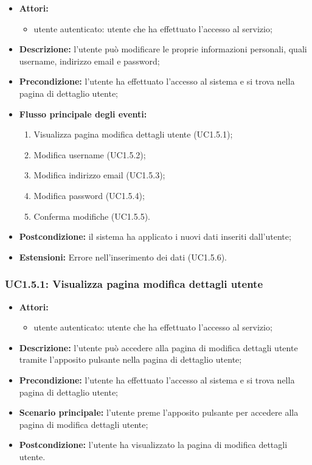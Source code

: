 \begin{itemize}
	\item \textbf{Attori:}
	\begin{itemize}
		\item utente autenticato: utente che ha effettuato l'accesso al servizio;
	\end{itemize}
	\item \textbf{Descrizione:} l'utente può modificare le proprie informazioni personali, quali username, indirizzo email e password;
	\item \textbf{Precondizione:} l'utente ha effettuato l'accesso al sistema e si trova nella pagina di dettaglio utente;
	\item \textbf{Flusso principale degli eventi:}
	\begin{enumerate}
		\item Visualizza pagina modifica dettagli utente (UC1.5.1);
		\item Modifica username (UC1.5.2);
		\item Modifica indirizzo email (UC1.5.3);
		\item Modifica password (UC1.5.4);
		\item Conferma modifiche (UC1.5.5).
	\end{enumerate}
	\item \textbf{Postcondizione:} il sistema ha applicato i nuovi dati inseriti dall'utente;
	\item \textbf{Estensioni:} Errore nell'inserimento dei dati (UC1.5.6).
\end{itemize}

\subsubsection{UC1.5.1: Visualizza pagina modifica dettagli utente}
\begin{itemize}
	\item \textbf{Attori:}
	\begin{itemize}
		\item utente autenticato: utente che ha effettuato l'accesso al servizio;
	\end{itemize}
	\item \textbf{Descrizione:} l'utente può accedere alla pagina di modifica dettagli utente tramite l'apposito pulsante nella pagina di dettaglio utente;
	\item \textbf{Precondizione:} l'utente ha effettuato l'accesso al sistema e si trova nella pagina di dettaglio utente;
	\item \textbf{Scenario principale:} l'utente preme l'apposito pulsante per accedere alla pagina di modifica dettagli utente;
	\item \textbf{Postcondizione:} l'utente ha visualizzato la pagina di modifica dettagli utente.
\end{itemize}

